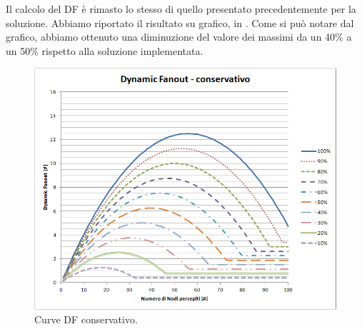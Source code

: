 Il calcolo del DF è rimasto lo stesso di quello presentato precedentemente per la soluzione. Abbiamo riportato il risultato su grafico, in . Come si può notare dal grafico, abbiamo ottenuto una diminuzione del valore dei massimi da un 40\% a un 50\% rispetto alla soluzione implementata.
\begin{figure}[t]
	\centering
	\includegraphics[width=0.9\linewidth]{Images/grafici_usati/DF_conservativo_tot_no_arr}
	\caption[DF conservativo]{Curve DF conservativo.}
	\label{fig:DF_conservativo_tot_no_arr}
\end{figure}
\bigskip



